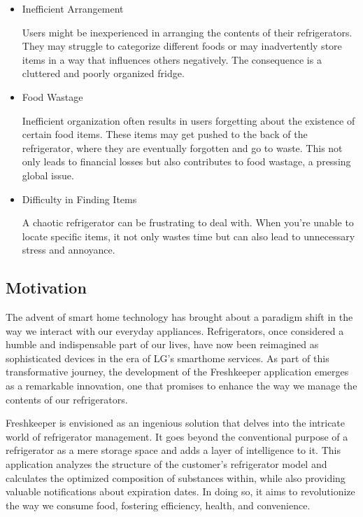 \documentclass[conference]{IEEEtran}
\begin{document}
\begin{itemize}
    \item Inefficient Arrangement\par
    Users might be inexperienced in arranging the contents of their refrigerators. They may struggle to categorize different foods or may inadvertently store items in a way that influences others negatively. The consequence is a cluttered and poorly organized fridge.    
    \item Food Wastage\par
    Inefficient organization often results in users forgetting about the existence of certain food items. These items may get pushed to the back of the refrigerator, where they are eventually forgotten and go to waste. This not only leads to financial losses but also contributes to food wastage, a pressing global issue.    
    \item Difficulty in Finding Items\par
    A chaotic refrigerator can be frustrating to deal with. When you're unable to locate specific items, it not only wastes time but can also lead to unnecessary stress and annoyance.
\end{itemize}

\subsection{Motivation}

The advent of smart home technology has brought about a paradigm shift in the way we interact with our everyday appliances. Refrigerators, once considered a humble and indispensable part of our lives, have now been reimagined as sophisticated devices in the era of LG's smarthome services. As part of this transformative journey, the development of the Freshkeeper application emerges as a remarkable innovation, one that promises to enhance the way we manage the contents of our refrigerators.

Freshkeeper is envisioned as an ingenious solution that delves into the intricate world of refrigerator management. It goes beyond the conventional purpose of a refrigerator as a mere storage space and adds a layer of intelligence to it. This application analyzes the structure of the customer's refrigerator model and calculates the optimized composition of substances within, while also providing valuable notifications about expiration dates. In doing so, it aims to revolutionize the way we consume food, fostering efficiency, health, and convenience.
\end{document}
